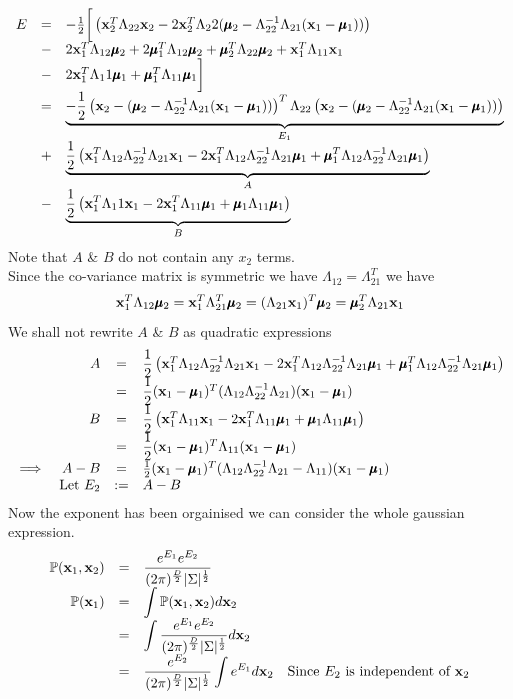 \documentclass[11pt,a4paper]{article}
\begin{document}
\[\begin{array}{rcl}
E&=&-\frac{1}{2}\bigg[\left(\textbf{x}_2^T\Lambda_{22}\textbf{x}_2-2\textbf{x}_2^T\Lambda_22(\pmb{\mu}_2-\Lambda_{22}^{-1}\Lambda_{21}(\textbf{x}_1-\pmb{\mu}_1))\right)\\
&-&2\textbf{x}_1^T\Lambda_{12}\pmb{\mu}_2+2\pmb{\mu}_1^T\Lambda_{12}\pmb{\mu}_2+\pmb{\mu}_2^T\Lambda_{22}\pmb{\mu}_2+\textbf{x}_1^T\Lambda_{11}\textbf{x}_1\\
&-&2\textbf{x}_1^T\Lambda_11\pmb{\mu}_1+\pmb{\mu}_1^T\Lambda_{11}\pmb{\mu}_1\bigg]\\
&=&\underbrace{-\frac{1}{2}\left(\textbf{x}_2-(\pmb{\mu}_2-\Lambda_{22}^{-1}\Lambda_{21}(\textbf{x}_1-\pmb{\mu}_1))\right)^T\Lambda_{22}\left(\textbf{x}_2-(\pmb{\mu}_2-\Lambda_{22}^{-1}\Lambda_{21}(\textbf{x}_1-\pmb{\mu}_1))\right)}_{E_1}\\
&+&\underbrace{\frac{1}{2}\left(\textbf{x}_1^T\Lambda_{12}\Lambda_{22}^{-1}\Lambda_{21}\textbf{x}_1-2\textbf{x}_1^T\Lambda_{12}\Lambda_{22}^{-1}\Lambda_{21}\pmb{\mu}_1+\pmb{\mu}_1^T\Lambda_{12}\Lambda_{22}^{-1}\Lambda_{21}\pmb{\mu}_1\right)}_{A}\\
&-&\underbrace{\frac{1}{2}\left(\textbf{x}_1^T\Lambda_11\textbf{x}_1-2\textbf{x}_1^T\Lambda_{11}\pmb{\mu}_1+\pmb{\mu}_{1}\Lambda_{11}\pmb{\mu}_1\right)}_{B}
\end{array}\]
Note that $A$ \& $B$ do not contain any $x_2$ terms.\\
Since the co-variance matrix is symmetric we have $\Lambda_{12}=\Lambda_{21}^T$ we have
$$\textbf{x}_1^T\Lambda_{12}\pmb{\mu}_2=\textbf{x}_1^T\Lambda_{21}^T\pmb{\mu}_2=(\Lambda_{21}\textbf{x}_1)^T\pmb{\mu}_2=\pmb{\mu}_2^T\Lambda_{21}\textbf{x}_1$$
We shall not rewrite $A$ \& $B$ as quadratic expressions
\[\begin{array}{rrcl}
&A&=&\dfrac{1}{2}\left(\textbf{x}_1^T\Lambda_{12}\Lambda_{22}^{-1}\Lambda_{21}\textbf{x}_1-2\textbf{x}_1^T\Lambda_{12}\Lambda_{22}^{-1}\Lambda_{21}\pmb{\mu}_1+\pmb{\mu}_1^T\Lambda_{12}\Lambda_{22}^{-1}\Lambda_{21}\pmb{\mu}_1\right)\\
&&=&\dfrac{1}{2}(\textbf{x}_1-\pmb{\mu}_1)^T(\Lambda_{12}\Lambda_{22}^{-1}\Lambda_{21})(\textbf{x}_1-\pmb{\mu}_1)\\
&B&=&\dfrac{1}{2}\left(\textbf{x}_1^T\Lambda_{11}\textbf{x}_1-2\textbf{x}_1^T\Lambda_{11}\pmb{\mu}_1+\pmb{\mu}_{1}\Lambda_{11}\pmb{\mu}_1\right)\\
&&=&\dfrac{1}{2}(\textbf{x}_1-\pmb{\mu}_1)^T\Lambda_{11}(\textbf{x}_1-\pmb{\mu}_1)\\
\implies&A-B&=&\frac{1}{2}(\textbf{x}_1-\pmb{\mu}_1)^T(\Lambda_{12}\Lambda_{22}^{-1}\Lambda_{21}-\Lambda_{11})(\textbf{x}_1-\pmb{\mu}_1)\\
&\mathrm{Let\ }E_2&:=&A-B
\end{array}\]
Now the exponent has been orgainised we can consider the whole gaussian expression.
\[\begin{array}{rcll}
\mathbb{P}(\textbf{x}_1,\textbf{x}_2)&=&\dfrac{e^{E_1}e^{E_2}}{(2\pi)^{\frac{D}{2}}|\Sigma|^{\frac{1}{2}}}\\
\mathbb{P}(\textbf{x}_1)&=&{\displaystyle\int\mathbb{P}(\textbf{x}_1,\textbf{x}_2)d\textbf{x}_2}\\
&=&{\displaystyle\int\dfrac{e^{E_1}e^{E_2}}{(2\pi)^{\frac{D}{2}}|\Sigma|^{\frac{1}{2}}}d\textbf{x}_2}\\
&=&{\dfrac{e^{E_2}}{(2\pi)^{\frac{D}{2}}|\Sigma|^{\frac{1}{2}}}\displaystyle\int e^{E_1}d\textbf{x}_2}&\text{Since $E_2$ is independent of $\textbf{x}_2$}
\end{array}\]
\end{document}
